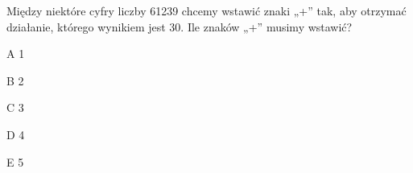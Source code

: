 \begin{tresc}
Między niektóre cyfry liczby 61239 chcemy wstawić znaki „+” tak, aby otrzymać działanie, którego wynikiem jest 30. Ile znaków „+” musimy wstawić?
\end{tresc}
\begin{wariant}{A} 1 \end{wariant}
\begin{wariant}{B} 2 \end{wariant}
\begin{wariant}{C} 3 \end{wariant}
\begin{wariant}{D} 4 \end{wariant}
\begin{wariant}{E} 5 \end{wariant}
